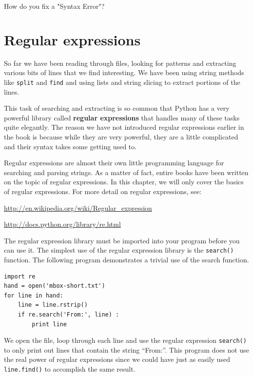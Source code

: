 \documentclass[11pt]{book}
\begin{document}
\begin{ex}
How do you fix a "Syntax Error"?
\end{ex}



\chapter{Regular expressions}

So far we have been reading through files, looking for patterns and extracting various bits of lines that we find interesting.  We have been using string methods like {\tt split} and {\tt find} and using lists and string slicing to extract portions of the lines.

This task of searching and extracting is so common that Python has a very powerful library called {\bf regular expressions} that handles many of these tasks quite elegantly.  The reason we have not introduced regular expressions earlier in the book is because while they are very powerful, they are a little complicated and their syntax takes some getting used to. 

Regular expressions are almost their own little programming language for searching and parsing strings.  As a matter of fact, entire books have been written on the topic of regular expressions.  In this chapter, we will only cover the basics of regular expressions.  For more detail on regular expressions, see:

\url{http://en.wikipedia.org/wiki/Regular_expression}

\url{http://docs.python.org/library/re.html}

The regular expression library must be imported into your program before you can use it.  The simplest use of the regular expression library is the {\tt search()} function.  The following program demonstrates a trivial use of the search function.

\beforeverb
\begin{verbatim}
import re
hand = open('mbox-short.txt')
for line in hand:
    line = line.rstrip()
    if re.search('From:', line) :
        print line
\end{verbatim}
\afterverb
%
We open the file, loop through each line and use the regular expression {\tt search()} to only print out lines that contain the string ``From:''.   This program does not use the real power of regular expressions since we could have just as easily used {\tt line.find()} to accomplish the same result.
\end{document}
